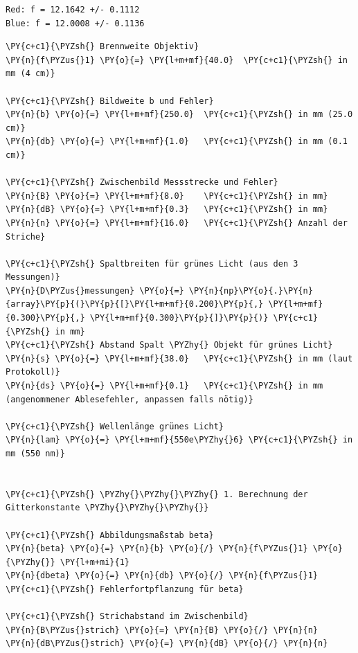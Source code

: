     \begin{Verbatim}[commandchars=\\\{\}]
Red: f = 12.1642 +/- 0.1112
Blue: f = 12.0008 +/- 0.1136
    \end{Verbatim}

    \begin{tcolorbox}[breakable, size=fbox, boxrule=1pt, pad at break*=1mm,colback=cellbackground, colframe=cellborder]
\begin{Verbatim}[commandchars=\\\{\}]
\PY{c+c1}{\PYZsh{} Brennweite Objektiv}
\PY{n}{f\PYZus{}1} \PY{o}{=} \PY{l+m+mf}{40.0}  \PY{c+c1}{\PYZsh{} in mm (4 cm)}

\PY{c+c1}{\PYZsh{} Bildweite b und Fehler}
\PY{n}{b} \PY{o}{=} \PY{l+m+mf}{250.0}  \PY{c+c1}{\PYZsh{} in mm (25.0 cm)}
\PY{n}{db} \PY{o}{=} \PY{l+m+mf}{1.0}   \PY{c+c1}{\PYZsh{} in mm (0.1 cm)}

\PY{c+c1}{\PYZsh{} Zwischenbild Messstrecke und Fehler}
\PY{n}{B} \PY{o}{=} \PY{l+m+mf}{8.0}    \PY{c+c1}{\PYZsh{} in mm}
\PY{n}{dB} \PY{o}{=} \PY{l+m+mf}{0.3}   \PY{c+c1}{\PYZsh{} in mm}
\PY{n}{n} \PY{o}{=} \PY{l+m+mf}{16.0}   \PY{c+c1}{\PYZsh{} Anzahl der Striche}

\PY{c+c1}{\PYZsh{} Spaltbreiten für grünes Licht (aus den 3 Messungen)}
\PY{n}{D\PYZus{}messungen} \PY{o}{=} \PY{n}{np}\PY{o}{.}\PY{n}{array}\PY{p}{(}\PY{p}{[}\PY{l+m+mf}{0.200}\PY{p}{,} \PY{l+m+mf}{0.300}\PY{p}{,} \PY{l+m+mf}{0.300}\PY{p}{]}\PY{p}{)} \PY{c+c1}{\PYZsh{} in mm}
\PY{c+c1}{\PYZsh{} Abstand Spalt \PYZhy{} Objekt für grünes Licht}
\PY{n}{s} \PY{o}{=} \PY{l+m+mf}{38.0}   \PY{c+c1}{\PYZsh{} in mm (laut Protokoll)}
\PY{n}{ds} \PY{o}{=} \PY{l+m+mf}{0.1}   \PY{c+c1}{\PYZsh{} in mm (angenommener Ablesefehler, anpassen falls nötig)}

\PY{c+c1}{\PYZsh{} Wellenlänge grünes Licht}
\PY{n}{lam} \PY{o}{=} \PY{l+m+mf}{550e\PYZhy{}6} \PY{c+c1}{\PYZsh{} in mm (550 nm)}


\PY{c+c1}{\PYZsh{} \PYZhy{}\PYZhy{}\PYZhy{} 1. Berechnung der Gitterkonstante \PYZhy{}\PYZhy{}\PYZhy{}}

\PY{c+c1}{\PYZsh{} Abbildungsmaßstab beta}
\PY{n}{beta} \PY{o}{=} \PY{n}{b} \PY{o}{/} \PY{n}{f\PYZus{}1} \PY{o}{\PYZhy{}} \PY{l+m+mi}{1}
\PY{n}{dbeta} \PY{o}{=} \PY{n}{db} \PY{o}{/} \PY{n}{f\PYZus{}1}  \PY{c+c1}{\PYZsh{} Fehlerfortpflanzung für beta}

\PY{c+c1}{\PYZsh{} Strichabstand im Zwischenbild}
\PY{n}{B\PYZus{}strich} \PY{o}{=} \PY{n}{B} \PY{o}{/} \PY{n}{n}
\PY{n}{dB\PYZus{}strich} \PY{o}{=} \PY{n}{dB} \PY{o}{/} \PY{n}{n}


\end{Verbatim}
\end{tcolorbox}
